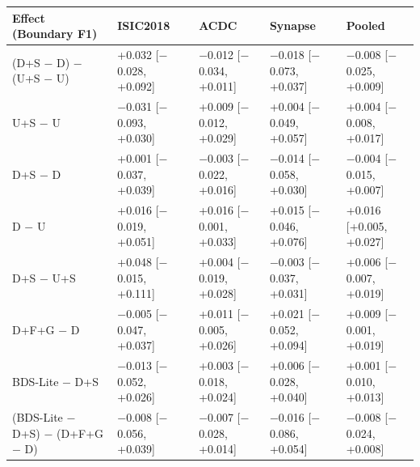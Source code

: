 \begin{tabular}{lllll}
\toprule
Effect (Boundary F1) & ISIC2018 & ACDC & Synapse & Pooled \\
\midrule
(D+S $-$ D) $-$ (U+S $-$ U) & +0.032 [$-$0.028, +0.092] & $-$0.012 [$-$0.034, +0.011] & $-$0.018 [$-$0.073, +0.037] & $-$0.008 [$-$0.025, +0.009] \\
U+S $-$ U & $-$0.031 [$-$0.093, +0.030] & +0.009 [$-$0.012, +0.029] & +0.004 [$-$0.049, +0.057] & +0.004 [$-$0.008, +0.017] \\
D+S $-$ D & +0.001 [$-$0.037, +0.039] & $-$0.003 [$-$0.022, +0.016] & $-$0.014 [$-$0.058, +0.030] & $-$0.004 [$-$0.015, +0.007] \\
D $-$ U & +0.016 [$-$0.019, +0.051] & +0.016 [$-$0.001, +0.033] & +0.015 [$-$0.046, +0.076] & +0.016 [+0.005, +0.027] \\
D+S $-$ U+S & +0.048 [$-$0.015, +0.111] & +0.004 [$-$0.019, +0.028] & $-$0.003 [$-$0.037, +0.031] & +0.006 [$-$0.007, +0.019] \\
D+F+G $-$ D & $-$0.005 [$-$0.047, +0.037] & +0.011 [$-$0.005, +0.026] & +0.021 [$-$0.052, +0.094] & +0.009 [$-$0.001, +0.019] \\
BDS-Lite $-$ D+S & $-$0.013 [$-$0.052, +0.026] & +0.003 [$-$0.018, +0.024] & +0.006 [$-$0.028, +0.040] & +0.001 [$-$0.010, +0.013] \\
(BDS-Lite $-$ D+S) $-$ (D+F+G $-$ D) & $-$0.008 [$-$0.056, +0.039] & $-$0.007 [$-$0.028, +0.014] & $-$0.016 [$-$0.086, +0.054] & $-$0.008 [$-$0.024, +0.008] \\
\bottomrule
\end{tabular}
